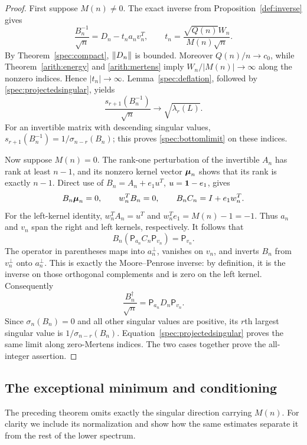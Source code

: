 \begin{proof}
First suppose $M(n)\ne0$. The exact inverse from Proposition~\ref{def:inverse} gives
\[
 \frac{B_n^{-1}}{\sqrt n}
 =D_n-t_na_nv_n^T,\qquad
 t_n=\frac{\sqrt{Q(n)}W_n}{M(n)\sqrt n}.
\]
By Theorem~\ref{spec:compact}, $\left\lVert D_n\right\rVert$ is bounded. Moreover $Q(n)/n\to c_0$, while Theorem~\ref{arith:energy} and \eqref{arith:mertens} imply $W_n/|M(n)|\to\infty$ along the nonzero indices. Hence $|t_n|\to\infty$. Lemma~\ref{spec:deflation}, followed by \eqref{spec:projectedsingular}, yields
\[
 \frac{s_{r+1}(B_n^{-1})}{\sqrt n}
 \longrightarrow\sqrt{\lambda_r(L)}.
\]
For an invertible matrix with descending singular values,
$s_{r+1}(B_n^{-1})=1/\sigma_{n-r}(B_n)$; this proves \eqref{spec:bottomlimit} on these indices.

Now suppose $M(n)=0$. The rank-one perturbation of the invertible $A_n$ has rank at least $n-1$, and its nonzero kernel vector $\boldsymbol{\mu}_n$ shows that its rank is exactly $n-1$. Direct use of $B_n=A_n+e_1u^T$, $u=\mathbf{1}-e_1$, gives
\[
 B_n\boldsymbol{\mu}_n=0,\qquad w_n^TB_n=0,\qquad
 B_nC_n=I+e_1w_n^T.
\]
For the left-kernel identity, $w_n^TA_n=u^T$ and $w_n^Te_1=M(n)-1=-1$. Thus $a_n$ and $v_n$ span the right and left kernels, respectively. It follows that
\[
 B_n(\mathsf P_{a_n}C_n\mathsf P_{v_n})=\mathsf P_{v_n}.
\]
The operator in parentheses maps into $a_n^\perp$, vanishes on $v_n$, and inverts $B_n$ from $v_n^\perp$ onto $a_n^\perp$. This is exactly the Moore--Penrose inverse: by definition, it is the inverse on those orthogonal complements and is zero on the left kernel. Consequently
\[
 \frac{B_n^\dagger}{\sqrt n}=\mathsf P_{a_n}D_n\mathsf P_{v_n}.
\]
Since $\sigma_n(B_n)=0$ and all other singular values are positive, its $r$th largest singular value is $1/\sigma_{n-r}(B_n)$. Equation~\eqref{spec:projectedsingular} proves the same limit along zero-Mertens indices. The two cases together prove the all-integer assertion.
\end{proof}

\subsection{The exceptional minimum and conditioning}

The preceding theorem omits exactly the singular direction carrying $M(n)$. For clarity we include its normalization and show how the same estimates separate it from the rest of the lower spectrum.

